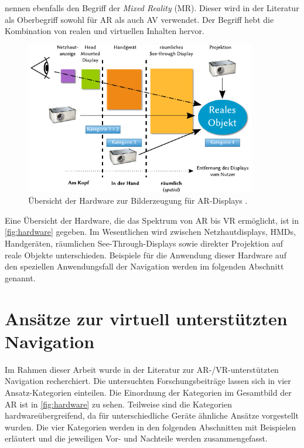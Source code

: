 \textcite{Milgram1994} nennen ebenfalls den Begriff der \emph{Mixed Reality} (MR).
Dieser wird in der Literatur als Oberbegriff sowohl für AR als auch AV verwendet.
Der Begriff hebt die Kombination von realen und virtuellen Inhalten hervor.

\begin{figure}[h]
    \centering
    \includegraphics[width=0.9\textwidth]{figures/ar_hardware_view.pdf}
    \caption{%
        Übersicht der Hardware zur Bilderzeugung für AR-Displays
        .
    }
    \label{fig:hardware}
\end{figure}
Eine Übersicht der Hardware, die das Spektrum von AR bis VR ermöglicht, ist in \autoref{fig:hardware} gegeben.
Im Wesentlichen wird zwischen Netzhautdisplays, HMDs, Handgeräten, räumlichen See-Through-Displays sowie direkter Projektion auf reale Objekte unterschieden.
Beispiele für die Anwendung dieser Hardware auf den speziellen Anwendungsfall der Navigation werden im folgenden Abschnitt genannt.


\section{Ansätze zur virtuell unterstützten Navigation}
Im Rahmen dieser Arbeit wurde in der Literatur zur AR-/VR-unterstützten Navigation recherchiert.
Die untersuchten Forschungsbeiträge lassen sich in vier Ansatz-Kategorien einteilen.
Die Einordnung der Kategorien im Gesamtbild der AR ist in \autoref{fig:hardware} zu sehen.
Teilweise sind die Kategorien hardwareübergreifend, da für unterschiedliche Geräte ähnliche Ansätze vorgestellt wurden.
Die vier Kategorien werden in den folgenden Abschnitten mit Beispielen erläutert und die jeweiligen Vor- und Nachteile werden zusammengefasst.

